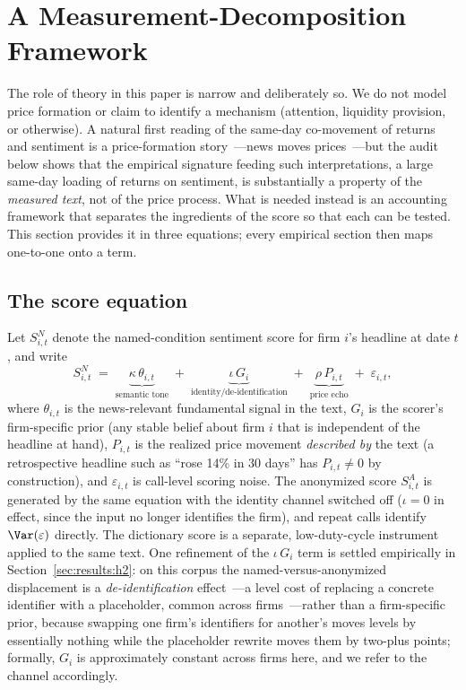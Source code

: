 \section{A Measurement-Decomposition Framework}\label{sec:framework}

The role of theory in this paper is narrow and deliberately so. We do not model price formation or claim to identify a mechanism (attention, liquidity provision, or otherwise). A natural first reading of the same-day co-movement of returns and sentiment is a price-formation story~---news moves prices~---but the audit below shows that the empirical signature feeding such interpretations, a large same-day loading of returns on sentiment, is substantially a property of the \emph{measured text}, not of the price process. What is needed instead is an accounting framework that separates the ingredients of the score so that each can be tested. This section provides it in three equations; every empirical section then maps one-to-one onto a term.

\subsection{The score equation}

Let $S^{N}_{i,t}$ denote the named-condition sentiment score for firm $i$'s headline at date $t$, and write
\begin{equation}\label{eq:score}
S^{N}_{i,t} \;=\; \underbrace{\kappa\,\theta_{i,t}}_{\text{semantic tone}}
\;+\; \underbrace{\iota\,G_i}_{\text{identity/de-identification}}
\;+\; \underbrace{\rho\,P_{i,t}}_{\text{price echo}}
\;+\; \varepsilon_{i,t},
\end{equation}
where $\theta_{i,t}$ is the news-relevant fundamental signal in the text, $G_i$ is the scorer's firm-specific prior (any stable belief about firm $i$ that is independent of the headline at hand), $P_{i,t}$ is the realized price movement \emph{described by} the text (a retrospective headline such as ``rose 14\% in 30 days'' has $P_{i,t}\neq 0$ by construction), and $\varepsilon_{i,t}$ is call-level scoring noise. The anonymized score $S^{A}_{i,t}$ is generated by the same equation with the identity channel switched off ($\iota=0$ in effect, since the input no longer identifies the firm), and repeat calls identify $\Var(\varepsilon)$ directly. The dictionary score is a separate, low-duty-cycle instrument applied to the same text. One refinement of the $\iota\,G_i$ term is settled empirically in Section~\ref{sec:results:h2}: on this corpus the named-versus-anonymized displacement is a \emph{de-identification} effect~---a level cost of replacing a concrete identifier with a placeholder, common across firms~---rather than a firm-specific prior, because swapping one firm's identifiers for another's moves levels by essentially nothing while the placeholder rewrite moves them by two-plus points; formally, $G_i$ is approximately constant across firms here, and we refer to the channel accordingly.

